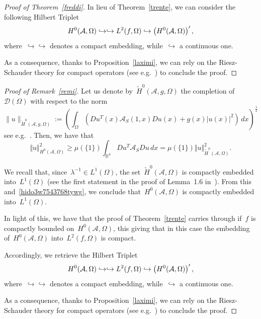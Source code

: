 \documentclass[11pt,hyp,]{nyjm}
\numberwithin{equation}{section}
\newcommand{\R}{\mathbb{R}}
\theoremstyle{remark}
\renewcommand{\geq}{\geqslant}
\begin{document}
\begin{proof}[Proof of Theorem~\ref{freddi}] 
In lieu of Theorem~\ref{trente}, we can consider the following Hilbert Triplet
\begin{equation}\label{tripl}
H^0(\mathcal{A}, \Omega) \hookrightarrow \hookrightarrow L^2(f, \Omega) \hookrightarrow \left(H^0(\mathcal{A}, \Omega) \right)\rq{},
\end{equation}	
where~$\hookrightarrow \hookrightarrow$ denotes a compact embedding, while~$\hookrightarrow$ a continuous one.

As a consequence, thanks to Proposition~\ref{laximi}, we can rely on the Riesz-Schauder theory for compact operators (see e.g.~\cite[Theorem~1.8.10]{gazzola}) to conclude the proof.
\end{proof}

\begin{proof}[Proof of Remark~\ref{remi}]
{L}et us denote by~$\widetilde{H}^0(\mathcal{A},g,\Omega)$ the completion of~$\mathcal{D}(\Omega)$ with respect to the norm 
\begin{equation}\label{hido3w7543768tywg00} \|u\|_{\widetilde{H}^0(\mathcal{A},g,\Omega)}:=\left(\int_\Omega\left(
Du^T(x) \mathcal{A}_S (1,x)Du(x)+ g(x)| u(x)|^2
\right)\,dx\right)^{\frac12}\end{equation}
see e.g.~\cite[Equation~(1.9)]{trudinger}.
Then, we have that
\begin{equation}\label{hido3w7543768tywg}
\Vert u \Vert^2_{H^{0}(\mathcal{A}, \Omega)} \geq \mu(\{ 1\})\int_{\R^n} Du^T \mathcal{A}_S Du\, dx = \mu(\{ 1\})\Vert u \Vert^2_{\widetilde{H}^{0}(\mathcal{A}, \Omega)}
.\end{equation}

We recall that, since~$\lambda^{-1}\in L^1(\Omega)$, the set~$\widetilde{H}^0(\mathcal{A},\Omega)$
is compactly embedded into~$L^1(\Omega)$ (see the first statement in the proof of Lemma~1.6 in~\cite{trudinger}).
{F}rom this and~\eqref{hido3w7543768tywg}, we conclude that~$H^{0}(\mathcal{A}, \Omega)$ is compactly embedded into~$L^1(\Omega)$.

In light of this, we have that the proof of Theorem~\ref{trente} carries through if~$f$ is compactly bounded on~$H^{0}(\mathcal{A}, \Omega)$, this giving
that in this case the embedding of~$H^{0}(\mathcal{A}, \Omega)$ into~$L^2(f, \Omega)$ is compact.

Accordingly, we retrieve the Hilbert Triplet 
\begin{equation}
H^0(\mathcal{A}, \Omega) \hookrightarrow \hookrightarrow L^2(f, \Omega) \hookrightarrow \left(H^0(\mathcal{A}, \Omega) \right)\rq{},
\end{equation}	
where~$\hookrightarrow \hookrightarrow$ denotes a compact embedding, while~$\hookrightarrow$ a continuous one.

As a consequence, thanks to Proposition~\ref{laximi}, we can rely on the Riesz-Schauder theory for compact operators (see e.g.~\cite[Theorem~1.8.10]{gazzola}) to conclude the proof.
\end{proof}
\end{document}
